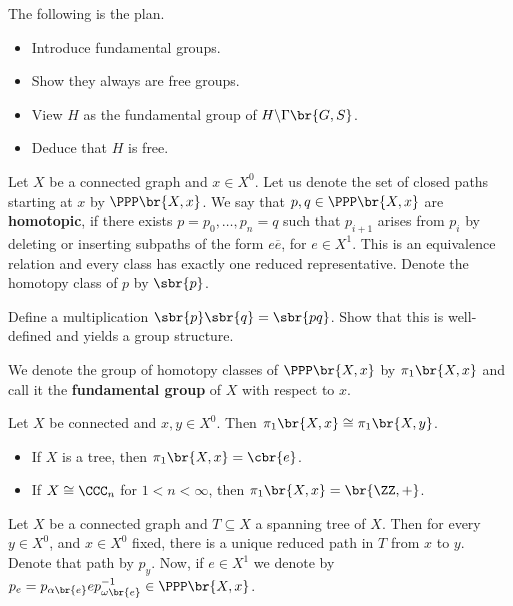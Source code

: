 The following is the plan.
\begin{itemize}
\item Introduce fundamental groups.
\item Show they always are free groups.
\item View $ H $ as the fundamental group of $ H \backslash \Gamma\br{G, S} $.
\item Deduce that $ H $ is free.
\end{itemize}

Let $ X $ be a connected graph and $ x \in X^0 $. Let us denote the set of closed paths starting at $ x $ by $ \PPP\br{X, x} $. We say that $ p, q \in \PPP\br{X, x} $ are \textbf{homotopic}, if there exists $ p = p_0, \dots, p_n = q $ such that $ p_{i + 1} $ arises from $ p_i $ by deleting or inserting subpaths of the form $ e\overline{e} $, for $ e \in X^1 $. This is an equivalence relation and every class has exactly one reduced representative. Denote the homotopy class of $ p $ by $ \sbr{p} $.

\begin{exercise}
Define a multiplication $ \sbr{p}\sbr{q} = \sbr{pq} $. Show that this is well-defined and yields a group structure.
\end{exercise}

\pagebreak

\begin{definition}
We denote the group of homotopy classes of $ \PPP\br{X, x} $ by $ \pi_1\br{X, x} $ and call it the \textbf{fundamental group} of $ X $ with respect to $ x $.
\end{definition}

\begin{exercise}
Let $ X $ be connected and $ x, y \in X^0 $. Then $ \pi_1\br{X, x} \cong \pi_1\br{X, y} $.
\end{exercise}


\begin{example}
\hfill
\begin{itemize}
\item If $ X $ is a tree, then $ \pi_1\br{X, x} = \cbr{e} $.
\item If $ X \cong \CCC_n $ for $ 1 < n < \infty $, then $ \pi_1\br{X, x} = \br{\ZZ, +} $.
\end{itemize}
\end{example}

\begin{definition}
Let $ X $ be a connected graph and $ T \subseteq X $ a spanning tree of $ X $. Then for every $ y \in X^0 $, and $ x \in X^0 $ fixed, there is a unique reduced path in $ T $ from $ x $ to $ y $. Denote that path by $ p_y $. Now, if $ e \in X^1 $ we denote by $ p_e = p_{\alpha\br{e}}ep_{\omega\br{e}}^{-1} \in \PPP\br{X, x} $.
\end{definition}

